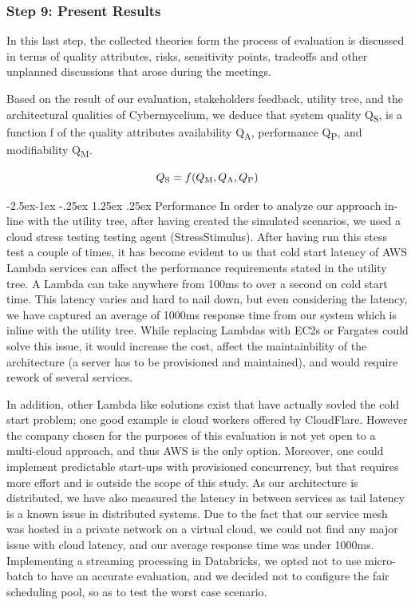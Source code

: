 \documentclass[review]{elsarticle}
\makeatletter
\renewcommand\paragraph{\@startsection{paragraph}{4}{\z@}%
            {-2.5ex\@plus -1ex \@minus -.25ex}%
            {1.25ex \@plus .25ex}%
            {\normalfont\normalsize\itshape}}
\makeatother
\begin{document}
\subsubsection{Step 9: Present Results} \label{evaluation-results}

In this last step, the collected theories form the process of evaluation is discussed in terms of quality attributes, risks, sensitivity points, tradeoffs and other unplanned discussions that arose during the meetings. 

Based on the result of our evaluation, stakeholders feedback, utility tree, and the architectural qualities of Cybermycelium, we deduce that system quality Q\textsubscript{S}, is a function f of the quality attributes availability Q\textsubscript{A}, performance Q\textsubscript{P}, and modifiability Q\textsubscript{M}.

\begin{equation}
    Q\textsubscript{S} = f(Q\textsubscript{M}, Q\textsubscript{A}, Q\textsubscript{P})
\end{equation}

\paragraph{Performance} In order to analyze our approach in-line with the utility tree, after having created the simulated scenarios, we used a cloud stress testing testing agent (StressStimulus). After having run this stess test a couple of times, it has become evident to us that cold start latency of AWS Lambda services can affect the performance requirements stated in the utility tree. A Lambda can take anywhere from 100ms to over a second on cold start time. This latency varies and hard to nail down, but even considering the latency, we have captured an average of 1000ms response time from our system which is inline with the utility tree. While replacing Lambdas with EC2s or Fargates could solve this issue, it would increase the cost, affect the maintainbility of the architecture (a server has to be provisioned and maintained), and would require rework of several services.

In addition, other Lambda like solutions exist that have actually sovled the cold start problem; one good example is cloud workers offered by CloudFlare. However the company chosen for the purposes of this evaluation is not yet open to a multi-cloud approach, and thus AWS is the only option. Moreover, one could implement predictable start-ups with provisioned concurrency, but that requires more effort and is outside the scope of this study. As our architecture is distributed, we have also measured the latency in between services as tail latency is a known issue in distributed systems. Due to the fact that our service mesh was hosted in a private network on a virtual cloud, we could not find any major issue with cloud latency, and our average response time was under 1000ms. Implementing a streaming processing in Databricks, we opted not to use micro-batch to have an accurate evaluation, and we decided not to configure the fair scheduling pool, so as to test the worst case scenario.
\end{document}
